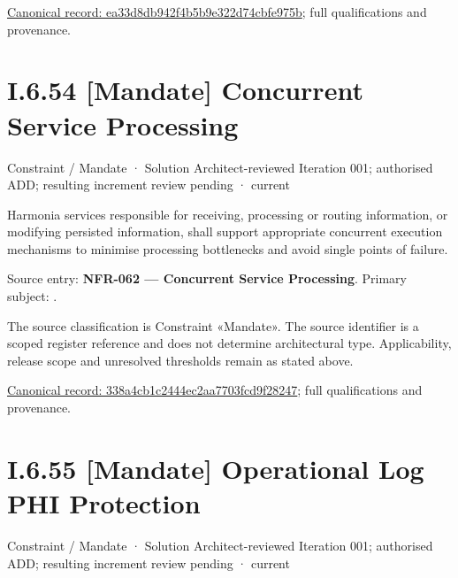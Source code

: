 {\footnotesize \href{../../../../../../../continuum/motivation/constraint/mandate/ea33d8db942f4b5b9e322d74cbfe975b.md}{Canonical record: ea33d8db942f4b5b9e322d74cbfe975b}; full qualifications and provenance.}\par
\section*{I.6.54 [Mandate] Concurrent Service Processing}
\label{navigation:I.6.54}

\label{element:338a4cb1c2444ec2aa7703fcd9f28247}
{\small Constraint / Mandate · Solution Architect-reviewed Iteration 001; authorised ADD; resulting increment review pending · current}\par

Harmonia services responsible for receiving, processing or routing information, or modifying persisted information, shall support appropriate concurrent execution mechanisms to minimise processing bottlenecks and avoid single points of failure.



Source entry: \textbf{NFR-062 — Concurrent Service Processing}. Primary subject: \texttt{}.



The source classification is Constraint «Mandate». The source identifier is a scoped register reference and does not determine architectural type. Applicability, release scope and unresolved thresholds remain as stated above.


{\footnotesize \href{../../../../../../../continuum/motivation/constraint/mandate/338a4cb1c2444ec2aa7703fcd9f28247.md}{Canonical record: 338a4cb1c2444ec2aa7703fcd9f28247}; full qualifications and provenance.}\par
\section*{I.6.55 [Mandate] Operational Log PHI Protection}
\label{navigation:I.6.55}

\label{element:ab99a48c29c14a1883e820baf98b643a}
{\small Constraint / Mandate · Solution Architect-reviewed Iteration 001; authorised ADD; resulting increment review pending · current}\par

